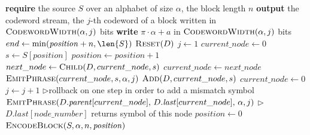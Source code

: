 \begin{algorithm}[H]
\caption{LZ78 encoder with block reset}
\label{alg:lz78-encoder}
\begin{algorithmic}[1]
\State \textbf{require} the source \(S\) over an alphabet of size \(\alpha\), the block length \(n\)
\State \textbf{output} the codeword stream, the \(j\)-th codeword of a block written in \(\Call{CodewordWidth}{\alpha, j}\) bits
\Statex
{}
    \State \textbf{write} $\pi \cdot \alpha + a$ in $\Call{CodewordWidth}{\alpha, j}$ bits
\EndProcedure
\Statex
{}
    \State $end \gets \min(\mathit{position} + n, \len{S})$
    \State $\Call{Reset}{D}$
    \State $j \gets 1$
    \State $current\_node \gets 0$
        \State $s \gets S[\mathit{position}]$
        \State $\mathit{position} \gets \mathit{position} + 1$
        \State $next\_node \gets \Call{Child}{D, current\_node, s}$
            \State $current\_node \gets next\_node$
        \Else
            \State $\Call{EmitPhrase}{current\_node, s, \alpha, j}$
            \State $\Call{Add}{D, current\_node, s}$
            \State $current\_node \gets 0$
            \State $j \gets j + 1$
        \EndIf
    \EndWhile
        \Statex\hspace{\algorithmicindent}\hspace{\algorithmicindent}
        $\triangleright${rollback on one step in order to add a mismatch symbol}
    \EndIf
    \State $\Call{EmitPhrase}{D.\mathit{parent}[current\_node],\, D.\mathit{last}[current\_node],\, \alpha, j}$
    \Statex \hspace{\algorithmicindent} $\triangleright${$D.last[node\_number]$ returns symbol of this node }
\EndProcedure
\Statex
{}
    \State $\mathit{position} \gets 0$
    \State $\Call{EncodeBlock}{S, \alpha, n, \mathit{position}}$
    \EndWhile
\EndProcedure
\end{algorithmic}
\end{algorithm}

